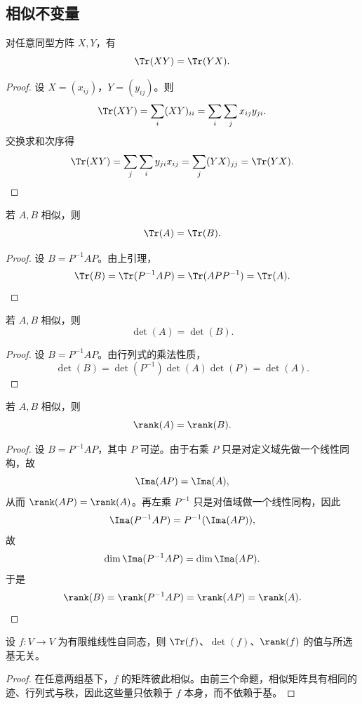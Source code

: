 \subsection{相似不变量}

\begin{lemma}
对任意同型方阵 $X,Y$，有
\[
  \Tr(XY)=\Tr(YX).
\]
\end{lemma}

\begin{proof}
设 $X=(x_{ij})$，$Y=(y_{ij})$。则
\[
  \Tr(XY)=\sum_i (XY)_{ii}=\sum_i\sum_j x_{ij}y_{ji}.
\]
交换求和次序得
\[
  \Tr(XY)=\sum_j\sum_i y_{ji}x_{ij}=\sum_j (YX)_{jj}=\Tr(YX).
\]
\end{proof}

\begin{proposition}
若 $A,B$ 相似，则
\[
  \Tr(A)=\Tr(B).
\]
\end{proposition}

\begin{proof}
设 $B=P^{-1}AP$。由上引理，
\[
  \Tr(B)=\Tr(P^{-1}AP)=\Tr(APP^{-1})=\Tr(A).
\]
\end{proof}

\begin{proposition}
若 $A,B$ 相似，则
\[
  \det(A)=\det(B).
\]
\end{proposition}

\begin{proof}
设 $B=P^{-1}AP$。由行列式的乘法性质，
\[
  \det(B)=\det(P^{-1})\det(A)\det(P)=\det(A).
\]
\end{proof}

\begin{proposition}
若 $A,B$ 相似，则
\[
  \rank(A)=\rank(B).
\]
\end{proposition}

\begin{proof}
设 $B=P^{-1}AP$，其中 $P$ 可逆。由于右乘 $P$ 只是对定义域先做一个线性同构，故
\[
  \Ima(AP)=\Ima(A),
\]
从而 $\rank(AP)=\rank(A)$。再左乘 $P^{-1}$ 只是对值域做一个线性同构，因此
\[
  \Ima(P^{-1}AP)=P^{-1}(\Ima(AP)),
\]
故
\[
  \dim\Ima(P^{-1}AP)=\dim\Ima(AP).
\]
于是
\[
  \rank(B)=\rank(P^{-1}AP)=\rank(AP)=\rank(A).
\]
\end{proof}

\begin{corollary}
设 $f\colon V\to V$ 为有限维线性自同态，则 $\Tr(f)$、$\det(f)$、$\rank(f)$ 的值与所选基无关。
\end{corollary}

\begin{proof}
在任意两组基下，$f$ 的矩阵彼此相似。由前三个命题，相似矩阵具有相同的迹、行列式与秩，因此这些量只依赖于 $f$ 本身，而不依赖于基。
\end{proof}

